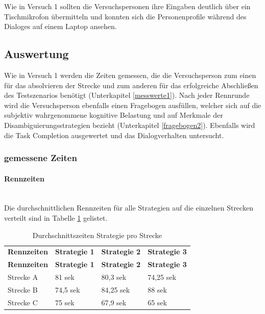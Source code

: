 \documentclass[12pt,a4paper]{scrartcl}
\begin{document}
Wie in Versuch 1 sollten die Versuchspersonen ihre Eingaben deutlich über ein Tischmikrofon übermitteln und konnten sich die Personenprofile während des Dialoges auf einem Laptop ansehen.



\subsection{Auswertung}
\label{auswertung2}
Wie in Versuch 1 werden die Zeiten gemessen, die die Versuchsperson zum einen für das absolvieren der Strecke und zum anderen für das erfolgreiche Abschließen des Testszenarios benötigt (Unterkapitel \ref{messwerte1}).
Nach jeder Rennrunde wird die Versuchsperson ebenfalls einen Fragebogen ausfüllen, welcher sich auf die subjektiv wahrgenommene kognitive Belastung und auf Merkmale der Disambiguierungsstrategien bezieht (Unterkapitel \ref{fragebogen2}). Ebenfalls wird die Task Completion ausgewertet und das Dialogverhalten untersucht. 
\subsubsection{gemessene Zeiten}
\label{messwerte}
\paragraph{Rennzeiten} 
~\\

Die durchschnittlichen Rennzeiten für alle Strategien auf die einzelnen Strecken verteilt sind in Tabelle \ref{RZ3SV2} gelistet. 
\begin{longtable}{p{3cm}p{3cm}p{3cm}p{3cm} }
	\label{RZ3SV2}\\
	\caption[Durchschnittszeiten Strategie pro Strecke]{Durchschnittszeiten Strategie pro Strecke}\\
	\hline
	\textbf{Rennzeiten}&\textbf{Strategie 1}&\textbf{Strategie 2} &\textbf{Strategie 3}\\
	\hline
	\endfirsthead
	\hline
	\textbf{Rennzeiten}&\textbf{Strategie 1}&\textbf{Strategie 2} &\textbf{Strategie 3}\\
	\hline
	\endhead
Strecke A & 81 sek & 80,3 sek & 74,25 sek \\
Strecke B & 74,5 sek & 84,25 sek & 88 sek \\
Strecke C & 75 sek & 67,9 sek & 65 sek \\
\hline
\end{longtable}
\end{document}
